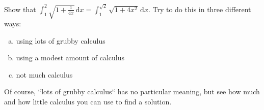 \documentclass{article}
\newenvironment{alphalist}{
  \begin{enumerate}[(a)]
    \addtolength{\itemsep}{-0.5\itemsep}}
  {\end{enumerate}}
\begin{document}
 

\noindent Show that $\int_1^2 \sqrt{1 + \frac{1}{4x}} \, \mathrm{d} x = \int_1^{\sqrt{2}} \sqrt{1+ 4 x^2}  \, \mathrm{d} x$. Try to do this in three different ways:

\begin{alphalist}

\item using lots of grubby calculus
\item using a modest amount of calculus
\item not much calculus
\end{alphalist}
Of course, ``lots of grubby calculus`` has no particular meaning, but see how much and how little calculus you can use to find a solution.
\end{document}
